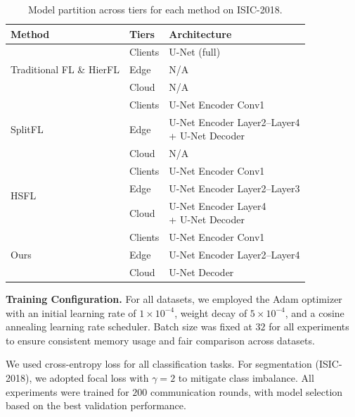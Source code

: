 \documentclass[letterpaper]{article} %
\begin{document}
        \begin{table}
            \centering
            \small
            \begin{tabular}{l|l|l}
            \hline
            \textbf{Method} & \textbf{Tiers} & \textbf{Architecture} \\
            \hline
            \multirow{3}{*}{Traditional FL \& HierFL} 
            & Clients & U-Net (full) \\
            & Edge & N/A \\
            & Cloud & N/A \\
            \hline
            \multirow{3}{*}{SplitFL} 
            & Clients & U-Net Encoder Conv1 \\
            & Edge & \makecell[l]{U-Net Encoder Layer2--Layer4 \\ + U-Net Decoder} \\
            & Cloud & N/A \\
            \hline
            \multirow{3}{*}{HSFL} 
            & Clients & U-Net Encoder Conv1 \\
            & Edge & U-Net Encoder Layer2--Layer3 \\
            & Cloud & \makecell[l]{U-Net Encoder Layer4 \\ + U-Net Decoder} \\
            \hline
            \multirow{3}{*}{Ours} 
            & Clients & U-Net Encoder Conv1 \\
            & Edge & U-Net Encoder Layer2--Layer4 \\
            & Cloud & U-Net Decoder \\ \hline
            \end{tabular}
            \caption{Model partition across tiers for each method on ISIC-2018.}
            \label{tab:model_isic2018}
        \end{table}




    \noindent\textbf{Training Configuration.} For all datasets, we employed the Adam optimizer with an initial learning rate of $1 \times 10^{-4}$, weight decay of $5 \times 10^{-4}$, and a cosine annealing learning rate scheduler. Batch size was fixed at $32$ for all experiments to ensure consistent memory usage and fair comparison across datasets.

    We used cross-entropy loss for all classification tasks. For segmentation (ISIC-2018), we adopted focal loss with $\gamma=2$ to mitigate class imbalance. All experiments were trained for $200$ communication rounds, with model selection based on the best validation performance.
    
\end{document}
